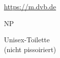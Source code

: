 \documentclass{kifschild}
\begin{document}
\begin{minipage}[b][\textheight][b]{.25\textwidth}%
  \centering

   \begin{fitbox}{.95\textwidth}{1cm}
     \url{https://m.dvb.de}
   \end{fitbox}
\end{minipage}
%
\hspace{.05\textwidth}
%
\begin{minipage}[b][\textheight][c]{.65\textwidth}

  \begin{fitbox}{\textwidth}{.5\textheight}  %
    \centering
    NP
  \end{fitbox}

  \vspace{2cm}
  \begin{fitbox}{\textwidth}{.22\textheight}
    \centering
    Unisex-Toilette\\
    (nicht pissoiriert)
  \end{fitbox}
\end{minipage}
\end{document}
